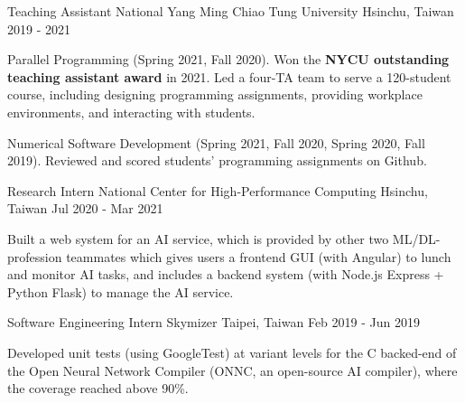 \begin{cventries}
  \cventry
    {Teaching Assistant} %
    {National Yang Ming Chiao Tung University} %
    {Hsinchu, Taiwan} %
    {2019 - 2021} %
    {
      \begin{cvitems} %
        \item {Parallel Programming (Spring 2021, Fall 2020). Won the \textbf{NYCU outstanding teaching assistant award} in 2021.
        Led a four-TA team to serve a 120-student course, including designing programming assignments,
        providing workplace environments, and interacting with students.
        }
        \item {Numerical Software Development (Spring 2021, Fall 2020, Spring 2020, Fall 2019).
        Reviewed and scored students' programming assignments on Github.
        }
      \end{cvitems}
    }

    \vspace{-2mm}

  \cventry
    {Research Intern} %
    {National Center for High-Performance Computing} %
    {Hsinchu, Taiwan} %
    {Jul 2020 - Mar 2021} %
    {
      \begin{cvitems} %
        \item {Built a web system for an AI service, which is provided by other two ML/DL-profession teammates
              which gives users a frontend GUI (with Angular) to lunch and monitor AI tasks,
              and includes a backend system (with Node.js Express + Python Flask) to manage the AI service.}
      \end{cvitems}
    }

    \vspace{-2mm}

  \cventry
    {Software Engineering Intern} %
    {Skymizer} %
    {Taipei, Taiwan} %
    {Feb 2019 - Jun 2019} %
    {
      \begin{cvitems} %
        \item {Developed unit tests (using GoogleTest) at variant levels for the C backed-end of
        the Open Neural Network Compiler (ONNC, an open-source AI compiler),
        where the coverage reached above 90\%.}
      \end{cvitems}
    }


\end{cventries}
